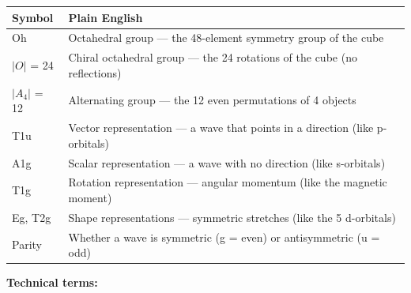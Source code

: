 \documentclass[
]{article}
\newcounter{none} %
\begin{document}
{\def\LTcaptype{none} %
\begin{longtable}[]{@{}
  >{\raggedright\arraybackslash}p{}
  >{\raggedright\arraybackslash}p{}@{}}
\toprule\noalign{}
\begin{minipage}[b]{\linewidth}\raggedright
Symbol
\end{minipage} & \begin{minipage}[b]{\linewidth}\raggedright
Plain English
\end{minipage} \\
\midrule\noalign{}
\endhead
\bottomrule\noalign{}
\endlastfoot
Oh & Octahedral group --- the 48-element symmetry group of the cube \\
\(\lvert O \rvert\) = 24 & Chiral octahedral group --- the 24 rotations
of the cube (no reflections) \\
\(\lvert A_4 \rvert\) = 12 & Alternating group --- the 12 even
permutations of 4 objects \\
T1u & Vector representation --- a wave that points in a direction (like
p-orbitals) \\
A1g & Scalar representation --- a wave with no direction (like
s-orbitals) \\
T1g & Rotation representation --- angular momentum (like the magnetic
moment) \\
Eg, T2g & Shape representations --- symmetric stretches (like the 5
d-orbitals) \\
Parity & Whether a wave is symmetric (g = even) or antisymmetric (u =
odd) \\
\end{longtable}
}

\textbf{Technical terms:}
\end{document}
